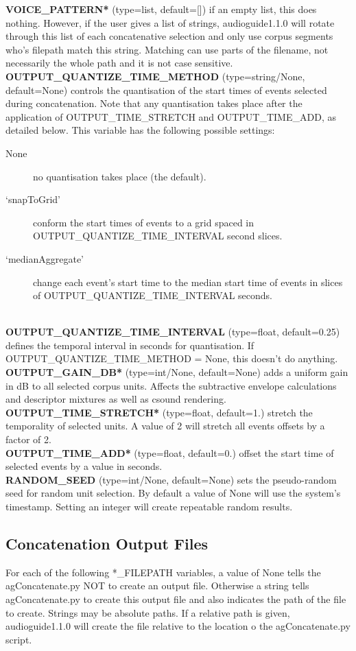 \documentclass{article}
\newcommand{\optEntry}[4]{\textbf{#1} (type=#2, default=#3) #4\hspace{0.5em}\\}
\newcommand{\ag}{audioguide1.1.0\xspace}
\begin{document}
\begin{spacing}{1.2}
\optEntry{VOICE\_PATTERN*}{list}{[]}{if an empty list, this does nothing.  However, if the user gives a list of strings, \ag will rotate through this list of each concatenative selection and only use corpus segments who's filepath match this string.  Matching can use parts of the filename, not necessarily the whole path and it is not case sensitive.}

\optEntry{OUTPUT\_QUANTIZE\_TIME\_METHOD}{string/None}{None}{controls the quantisation of the start times of events selected during concatenation.  Note that any quantisation takes place after the application of OUTPUT\_TIME\_STRETCH and OUTPUT\_TIME\_ADD, as detailed below.  This variable has the following possible settings:
\begin{description}
\item[None] no quantisation takes place (the default).
\item[`snapToGrid'] conform the start times of events to a grid spaced in OUTPUT\_QUANTIZE\_TIME\_INTERVAL second slices.
\item[`medianAggregate'] change each event's start time to the median start time of events in slices of OUTPUT\_QUANTIZE\_TIME\_INTERVAL seconds.  
\end{description}
}

\optEntry{OUTPUT\_QUANTIZE\_TIME\_INTERVAL}{float}{0.25}{defines the temporal interval in seconds for quantisation.  If OUTPUT\_QUANTIZE\_TIME\_METHOD = None, this doesn't do anything.}

\optEntry{OUTPUT\_GAIN\_DB*}{int/None}{None}{adds a uniform gain in dB to all selected corpus units.  Affects the subtractive envelope calculations and descriptor mixtures as well as csound rendering.}

\optEntry{OUTPUT\_TIME\_STRETCH*}{float}{1.}{stretch the temporality of selected units.  A value of 2 will stretch all events offsets by a factor of 2.}

\optEntry{OUTPUT\_TIME\_ADD*}{float}{0.}{offset the start time of selected events by a value in seconds.}

\optEntry{RANDOM\_SEED}{int/None}{None}{sets the pseudo-random seed for random unit selection.  By default a value of None will use the system's timestamp.  Setting an integer will create repeatable random results.}


\subsection{Concatenation Output Files}\label{outputfiles}
For each of the following *\_FILEPATH variables, a value of None tells the agConcatenate.py NOT to create an output file.  Otherwise a string tells agConcatenate.py to create this output file and also indicates the path of the file to create.  Strings may be absolute paths.  If a relative path is given, \ag will create the file relative to the location o the agConcatenate.py script.


\end{spacing}
\end{document}

